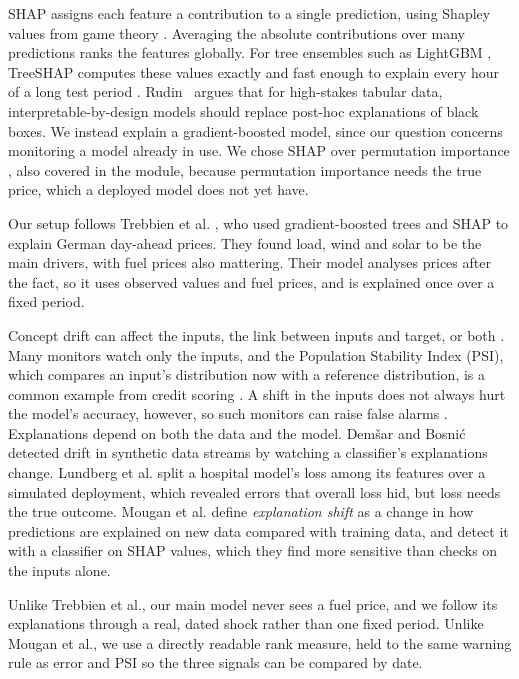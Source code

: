 
SHAP assigns each feature a contribution to a single prediction, using
Shapley values from game theory \cite{lundberg2017}. Averaging the absolute
contributions over many predictions ranks the features globally. For tree
ensembles such as LightGBM \cite{ke2017}, TreeSHAP computes these values
exactly and fast enough to explain every hour of a long test period
\cite{lundberg2020}. Rudin~\cite{rudin2019stop} argues that for high-stakes 
tabular data, interpretable-by-design models should replace post-hoc explanations 
of black boxes. We instead explain a gradient-boosted model, since our question 
concerns monitoring a model already in use. We chose SHAP over permutation importance
\cite{breiman2001}, also covered in the module, because permutation
importance needs the true price, which a deployed model does not yet have.

Our setup follows Trebbien et al. \cite{trebbien2023}, who used
gradient-boosted trees and SHAP to explain German day-ahead prices. They
found load, wind and solar to be the main drivers, with fuel prices also
mattering. Their model analyses prices after the fact, so it uses observed
values and fuel prices, and is explained once over a fixed period.

Concept drift can affect the inputs, the link between inputs and target, or
both \cite{gama2014}. Many monitors watch only the inputs, and the
Population Stability Index (PSI), which compares an input's distribution now
with a reference distribution, is a common example from credit scoring
\cite{yurdakul2018}. A shift in the inputs does not always hurt the model's accuracy, however,
so such monitors can raise false alarms \cite{mougan2025}. Explanations
depend on both the data and the model. Dem\v{s}ar and Bosni\'{c}
\cite{demsar2018} detected drift in synthetic data streams by watching a
classifier's explanations change. Lundberg et al. \cite{lundberg2020} split
a hospital model's loss among its features over a simulated deployment,
which revealed errors that overall loss hid, but loss needs the true
outcome. Mougan et al. \cite{mougan2025} define \emph{explanation shift} as
a change in how predictions are explained on new data compared with training
data, and detect it with a classifier on SHAP values, which they find more
sensitive than checks on the inputs alone.

Unlike Trebbien et al., our main model never sees a fuel price, and we
follow its explanations through a real, dated shock rather than one fixed
period. Unlike Mougan et al., we use a directly readable rank measure, held
to the same warning rule as error and PSI so the three signals can be
compared by date.